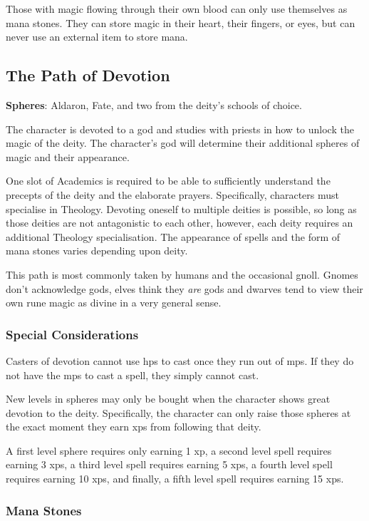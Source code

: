 \begin{multicols}{2}
Those with magic flowing through their own blood can only use themselves as mana stones.
They can store magic in their heart, their fingers, or eyes, but can never use an external item to store mana.

\subsection{The Path of Devotion}

\textbf{Spheres}: Aldaron, Fate, and two from the deity's schools of choice.

\noindent The character is devoted to a god and studies with priests in how to unlock the magic of the deity. The character's god will determine their additional spheres of magic and their appearance.

One slot of Academics is required to be able to sufficiently understand the precepts of the deity and the elaborate prayers. Specifically, characters must specialise in Theology. Devoting oneself to multiple deities is possible, so long as those deities are not antagonistic to each other, however, each deity requires an additional Theology specialisation. The appearance of spells and the form of mana stones varies depending upon deity.

This path is most commonly taken by humans and the occasional gnoll. Gnomes don't acknowledge gods, elves think they \emph{are} gods and dwarves tend to view their own rune magic as divine in a very general sense.

\subsubsection{Special Considerations}

Casters of devotion cannot use \glspl{hp} to cast once they run out of \glspl{mp}.
If they do not have the \glspl{mp} to cast a spell, they simply cannot cast.

New levels in spheres may only be bought when the character shows great devotion to the deity.
Specifically, the character can only raise those spheres at the exact moment they earn \glspl{xp} from following that deity.

A first level sphere requires only earning 1 \gls{xp}, a second level spell requires earning 3 \glspl{xp}, a third level spell requires earning 5 \glspl{xp}, a fourth level spell requires earning 10 \glspl{xp}, and finally, a fifth level spell requires earning 15 \glspl{xp}.

\subsubsection{Mana Stones}


\end{multicols}
